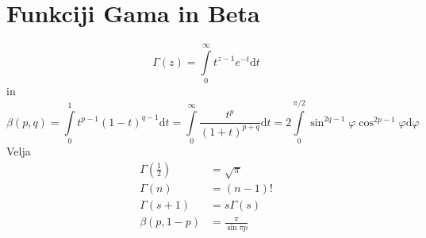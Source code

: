 \documentclass[a4paper,12pt]{article}
\def\dif{\mathrm{d}}
\begin{document}
\section{Funkciji Gama in Beta}
$$
\Gamma(z) = \int\limits_0^\infty t^{z-1} e^{-t}\dif t
$$
%
in
%
$$\beta (p, q) = \int\limits_0^1 t^{p-1} (1-t)^{q-1} \dif t 
= \int\limits_0^\infty \frac{t^p}{(1+t)^{p+q}} \dif t
= 2 \int\limits_0^{\pi /2} \sin^{2q-1}\varphi \cos ^{2p-1} \varphi \dif \varphi
$$
Velja
\begin{align*}
    \Gamma\left( \frac{1}{2} \right)  &= \sqrt{\pi}\\    
    \Gamma(n) &= (n-1)!\\
    \Gamma(s+1) &= s\Gamma(s)\\
    \beta (p, 1-p) &= \frac{\pi}{\sin \pi p}
\end{align*}
\end{document}
